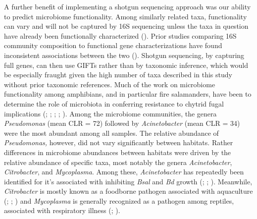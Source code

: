 \documentclass[
  12pt,
]{article}
\begin{document}
A further benefit of implementing a shotgun sequencing approach was our
ability to predict microbiome functionality. Among similarly related
taxa, functionality can vary and will not be captured by 16S sequencing
unless the taxa in question have already been functionally characterized
(). Prior
studies comparing 16S community composition to functional gene
characterizations have found inconsistent associations between the two
().
Shotgun sequencing, by capturing full genes, can then use GIFTs rather
than by taxonomic inference, which would be especially fraught given the
high number of taxa described in this study without prior taxonomic
references. Much of the work on microbiome functionality among
amphibians, and in particular fire salamanders, have been to determine
the role of microbiota in conferring resistance to chytrid fugal
implications (;
;
;
;
). Among the
microbiome communities, the genera \emph{Pseudomonas} (mean CLR = 72)
followed by \emph{Acinetobacter} (mean CLR = 34) were the most abundant
among all samples. The relative abundance of \emph{Pseudomonas,}
however, did not vary significantly between habitats. Rather differences
in microbiome abundances between habitats were driven by the relative
abundance of specific taxa, most notably the genera
\emph{Acinetobacter}, \emph{Citrobacter}, and \emph{Mycoplasma}. Among
these, \emph{Acinetobacter} has repeatedly been identified for it's
associated with inhibiting \emph{Bsal} and \emph{Bd} growth
(;
;
). Meanwhile,
\emph{Citrobacter} is mostly known as a foodborne pathogen associated
with aquaculture (; ;
) and \emph{Mycoplasma} is
generally recognized as a pathogen among reptiles, associated with
respiratory illness (; ).
\end{document}
